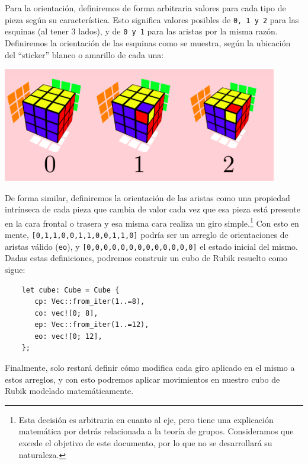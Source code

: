 \begin{multicols}{2}
Para la orientación, definiremos de forma arbitraria valores para cada tipo de pieza según su característica. Esto significa valores posibles de \texttt{0, 1 y 2} para las esquinas (al tener 3 lados), y de \texttt{0 y 1} para las aristas por la misma razón. Definiremos la orientación de las esquinas como se muestra, según la ubicación del ``sticker'' blanco o amarillo de cada una:

\begin{Figure}
\centering
    \includegraphics[width=0.9\textwidth]{img/rotations.png}
 \label{fig:rotations}
\end{Figure}

De forma similar, definiremos la orientación de las aristas como una propiedad intrínseca de cada pieza que cambia de valor cada vez que esa pieza está presente en la cara frontal o trasera y esa misma cara realiza un giro simple.\footnote{Esta decisión es arbitraria en cuanto al eje, pero tiene una explicación matemática por detrás relacionada a la teoría de grupos. Consideramos que excede el objetivo de este documento, por lo que no se desarrollará su naturaleza.} Con esto en mente, \texttt{[0,1,1,0,0,1,1,0,0,1,1,0]} podría ser un arreglo de orientaciones de aristas válido (\texttt{eo}), y \texttt{[0,0,0,0,0,0,0,0,0,0,0,0,0]} el estado inicial del mismo.\\

Dadas estas definiciones, podremos construir un cubo de Rubik resuelto como sigue:

\begin{verbatim}
    let cube: Cube = Cube {
       cp: Vec::from_iter(1..=8),
       co: vec![0; 8],
       ep: Vec::from_iter(1..=12),
       eo: vec![0; 12],
    };
\end{verbatim}

Finalmente, solo restará definir cómo modifica cada giro aplicado en el mismo a estos arreglos, y con esto podremos aplicar movimientos en nuestro cubo de Rubik modelado matemáticamente.


\end{multicols}
